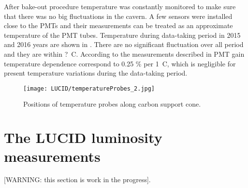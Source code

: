 After bake-out procedure temperature was constantly monitored to make sure that there was no big fluctuations in the cavern.
A few sensors were installed close to the PMTs and their measurements can be treated as an approximate temperature of the PMT tubes.
Temperature during data-taking period in 2015 and 2016 years are shown in . 
There are no significant fluctuation over all period and they are within ?\degree~C.
According to the measurements described in  PMT gain temperature dependence correspond
to 0.25 $\%$ per 1\degree~C, which is negligible for present temperature variations during the data-taking period.




\begin{figure}
\centering
\texttt{[image: LUCID/temperatureProbes\_2.jpg]}
\caption{Positions of temperature probes along carbon support cone.}
\label{fig:temperatureProbes_VJCone}
\end{figure}





 

\section{The LUCID luminosity measurements}

[WARNING: this section is work in the progress].

